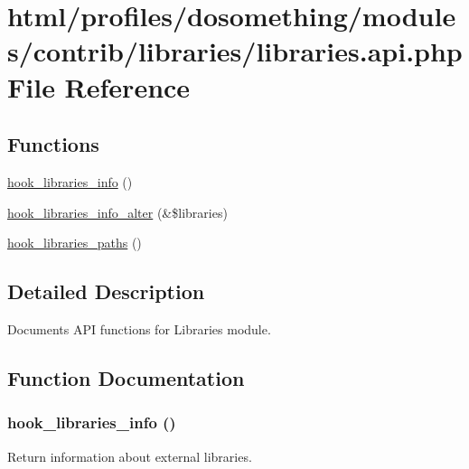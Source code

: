 \hypertarget{libraries_8api_8php}{
\section{html/profiles/dosomething/modules/contrib/libraries/libraries.api.php File Reference}
\label{libraries_8api_8php}
}
\subsection*{Functions}
\begin{DoxyCompactItemize}
\item 
\hyperlink{libraries_8api_8php_abe57a1a01f1d2d134a9014258fe9e016}{hook\_\-libraries\_\-info} ()
\item 
\hyperlink{libraries_8api_8php_a6143e19206c3ddd8b4241306edf201a1}{hook\_\-libraries\_\-info\_\-alter} (\&\$libraries)
\item 
\hyperlink{libraries_8api_8php_ad555eecec1a3347c79dce2ef7d09c24c}{hook\_\-libraries\_\-paths} ()
\end{DoxyCompactItemize}


\subsection{Detailed Description}
Documents API functions for Libraries module. 

\subsection{Function Documentation}
\hypertarget{libraries_8api_8php_abe57a1a01f1d2d134a9014258fe9e016}{
\subsubsection[{hook\_\-libraries\_\-info}]{\setlength{\rightskip}{0pt plus 5cm}hook\_\-libraries\_\-info ()}}
\label{libraries_8api_8php_abe57a1a01f1d2d134a9014258fe9e016}
Return information about external libraries.


